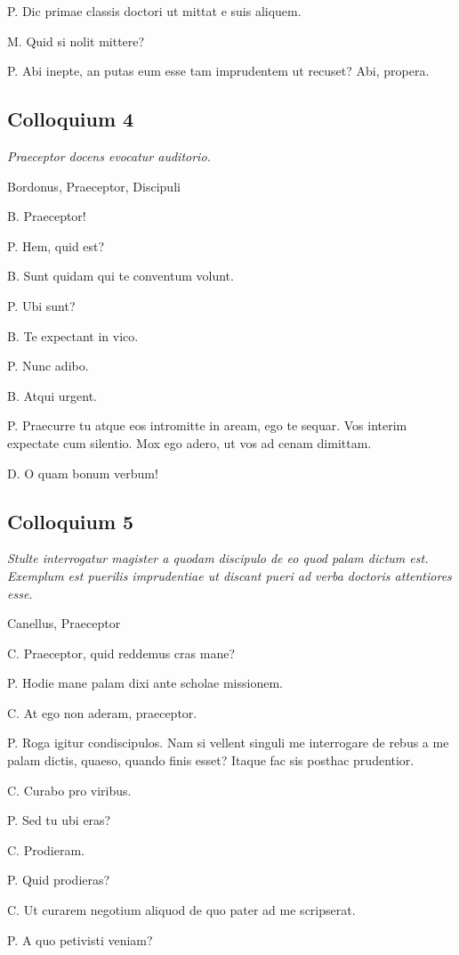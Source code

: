 \documentclass{article}
\begin{document}
P. Dic primae classis doctori ut mittat e suis aliquem.

M. Quid si nolit mittere?

P. Abi inepte, an putas eum esse tam imprudentem ut recuset? Abi, propera.

\subsection{Colloquium 4}
\emph{Praeceptor docens evocatur auditorio.}

Bordonus, Praeceptor, Discipuli

B. Praeceptor!

P. Hem, quid est?

B. Sunt quidam qui te conventum volunt.

P. Ubi sunt?

B. Te expectant in vico.

P. Nunc adibo.

B. Atqui urgent.

P. Praecurre tu atque eos intromitte in aream, ego te sequar. Vos interim expectate cum silentio. Mox ego adero, ut vos ad cenam dimittam.

D. O quam bonum verbum!

\subsection{Colloquium 5}
\emph{Stulte interrogatur magister a quodam discipulo de eo quod palam dictum est. Exemplum est puerilis imprudentiae ut discant pueri ad verba doctoris attentiores esse.}

Canellus, Praeceptor

C. Praeceptor, quid reddemus cras mane?

P. Hodie mane palam dixi ante scholae missionem.

C. At ego non aderam, praeceptor.

P. Roga igitur condiscipulos. Nam si vellent singuli me interrogare de rebus a me palam dictis, quaeso, quando finis esset? Itaque fac sis posthac prudentior.

C. Curabo pro viribus.

P. Sed tu ubi eras?

C. Prodieram.

P. Quid prodieras?

C. Ut curarem negotium aliquod de quo pater ad me scripserat.

P. A quo petivisti veniam?
\end{document}
